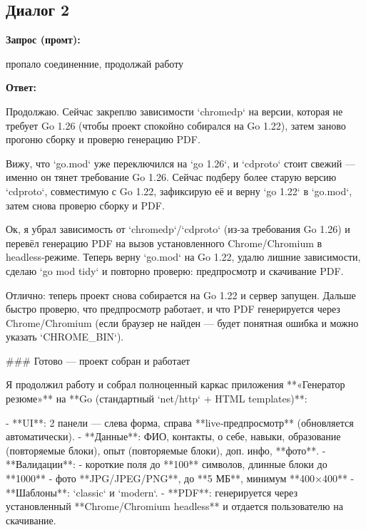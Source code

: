 \documentclass[a4paper, 14pt]{extarticle} %
\begin{document}
\subsection*{Диалог 2}

\textbf{Запрос (промт):}

\begin{PromptBlock}

пропало соединенние, продолжай работу

\end{PromptBlock}

\textbf{Ответ:}

\begin{AnswerBlock}

Продолжаю. Сейчас закреплю зависимости `chromedp` на версии, которая не требует Go 1.26 (чтобы проект спокойно собирался на Go 1.22), затем заново прогоню сборку и проверю генерацию PDF.

Вижу, что `go.mod` уже переключился на `go 1.26`, и `cdproto` стоит свежий — именно он тянет требование Go 1.26. Сейчас подберу более старую версию `cdproto`, совместимую с Go 1.22, зафиксирую её и верну `go 1.22` в `go.mod`, затем снова проверю сборку и PDF.

Ок, я убрал зависимость от `chromedp`/`cdproto` (из‑за требования Go 1.26) и перевёл генерацию PDF на вызов установленного Chrome/Chromium в headless‑режиме. Теперь верну `go.mod` на Go 1.22, удалю лишние зависимости, сделаю `go mod tidy` и повторно проверю: предпросмотр и скачивание PDF.

Отлично: теперь проект снова собирается на Go 1.22 и сервер запущен. Дальше быстро проверю, что предпросмотр работает, и что PDF генерируется через Chrome/Chromium (если браузер не найден — будет понятная ошибка и можно указать `CHROME_BIN`).

### Готово — проект собран и работает

Я продолжил работу и собрал полноценный каркас приложения **«Генератор резюме»** на **Go (стандартный `net/http` + HTML templates)**:

- **UI**: 2 панели — слева форма, справа **live‑предпросмотр** (обновляется автоматически).
- **Данные**: ФИО, контакты, о себе, навыки, образование (повторяемые блоки), опыт (повторяемые блоки), доп. инфо, **фото**.
- **Валидации**:
  - короткие поля до **100** символов, длинные блоки до **1000**
  - фото **JPG/JPEG/PNG**, до **5 МБ**, минимум **400×400**
- **Шаблоны**: `classic` и `modern`.
- **PDF**: генерируется через установленный **Chrome/Chromium headless** и отдается пользователю на скачивание.


\end{AnswerBlock}
\end{document}
